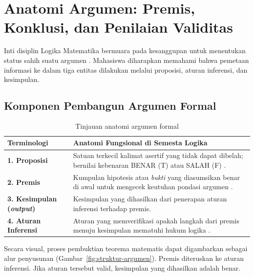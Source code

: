 \section{Anatomi Argumen: Premis, Konklusi, dan Penilaian Validitas}

Inti disiplin Logika Matematika bermuara pada kesanggupan untuk menentukan status sahih suatu argumen \cite{forallx,copi2014}. Mahasiswa diharapkan memahami bahwa pemetaan informasi ke dalam tiga entitas dilakukan melalui proposisi, aturan inferensi, dan kesimpulan.

\subsection{Komponen Pembangun Argumen Formal}

\begin{table}[H]
\centering
\small
\begin{tabular}{|>{\raggedright\arraybackslash}p{2.8cm}|>{\raggedright\arraybackslash}p{9.4cm}|}
\hline
\textbf{Terminologi} & \textbf{Anatomi Fungsional di Semesta Logika} \\
\hline
\textbf{1. Proposisi} & Satuan terkecil kalimat asertif yang tidak dapat dibelah; bernilai kebenaran BENAR (T) atau SALAH (F) \cite{rosen2019}. \\
\hline
\textbf{2. Premis} & Kumpulan hipotesis atau \textit{bukti} yang diasumsikan benar di awal untuk mengecek keutuhan pondasi argumen \cite{copi2014}. \\
\hline
\textbf{3. Kesimpulan (\textit{output})} & Kesimpulan yang dihasilkan dari penerapan aturan inferensi terhadap premis. \\
\hline
\textbf{4. Aturan Inferensi} & Aturan yang memverifikasi apakah langkah dari premis menuju kesimpulan mematuhi hukum logika \cite{iep_natded}. \\
\hline
\end{tabular}
\caption{Tinjauan anatomi argumen formal}
\label{tab:konsep-logika}
\end{table}

Secara visual, proses pembuktian teorema matematis dapat digambarkan sebagai alur penyusunan (Gambar~\ref{fig:struktur-argumen}). Premis diteruskan ke aturan inferensi. Jika aturan tersebut valid, kesimpulan yang dihasilkan adalah benar.

